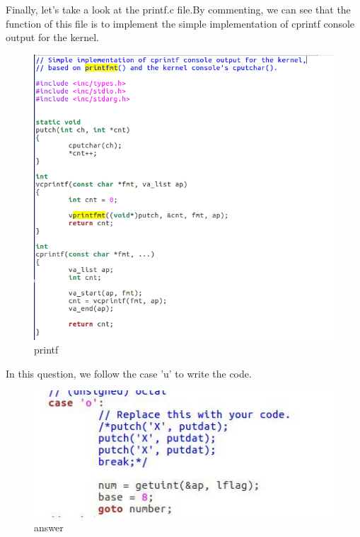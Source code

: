Finally, let's take a look at the printf.c file.By commenting, we can see that the function of this file is to implement the simple implementation of cprintf console output for the kernel.
\begin{figure}[H]
  \centering
  \includegraphics[width=0.8\linewidth]{figure/printf}
  \caption{printf}\label{2}
\end{figure}

In this question, we follow the case 'u' to write the code.
\begin{figure}[H]
  \centering
  \includegraphics[width=0.8\linewidth]{figure/homework1_answer}
  \caption{answer}\label{2}
\end{figure}

